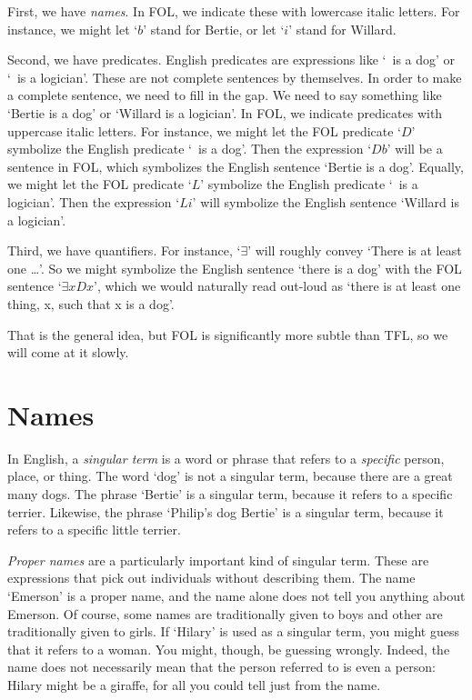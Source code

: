 First, we have \emph{names}. In FOL, we indicate these with lowercase italic letters. For instance, we might let `$b$' stand for Bertie, or let `$i$' stand for Willard.

Second, we have predicates. English predicates are expressions like `\blank\ is a dog' or `\blank\ is a logician'. These are not complete sentences by themselves. In order to make a complete sentence, we need to fill in the gap. We need to say something like `Bertie is a dog' or `Willard is a logician'. In FOL, we indicate predicates with uppercase italic letters. For instance, we might let the FOL predicate `$D$' symbolize the English predicate `\blank\ is a dog'. Then the expression `$Db$' will be a sentence in FOL, which symbolizes the English sentence `Bertie is a dog'. Equally, we might let the FOL predicate `$L$' symbolize the English predicate `\blank\ is a logician'. Then the expression `$Li$' will symbolize the English sentence `Willard is a logician'.

Third, we have quantifiers. For instance, `$\exists$' will roughly convey `There is at least one \ldots'. So we might symbolize the English sentence `there is a dog' with the FOL sentence `$\exists x Dx$', which we would naturally read out-loud as `there is at least one thing, x, such that x is a dog'.

That is the general idea, but FOL is significantly more subtle than TFL, so we will come at it slowly. 


\section{Names}
In English, a \emph{singular term} is a word or phrase that refers to a \emph{specific} person, place, or thing. The word `dog' is not a singular term, because there are a great many dogs. The phrase `Bertie' is a singular term, because it refers to a specific terrier. Likewise, the phrase `Philip's dog Bertie' is a singular term, because it refers to a specific little terrier. 

\emph{Proper names} are a particularly important kind of singular term. These are expressions that pick out individuals without describing them. The name `Emerson' is a proper name, and the name alone does not tell you anything about Emerson. Of course, some names are traditionally given to boys and other are traditionally given to girls. If `Hilary' is used as a singular term, you might guess that it refers to a woman. You might, though, be guessing wrongly. Indeed, the name does not necessarily mean that the person referred to is even a person: Hilary might be a giraffe, for all you could tell just from the name. 

